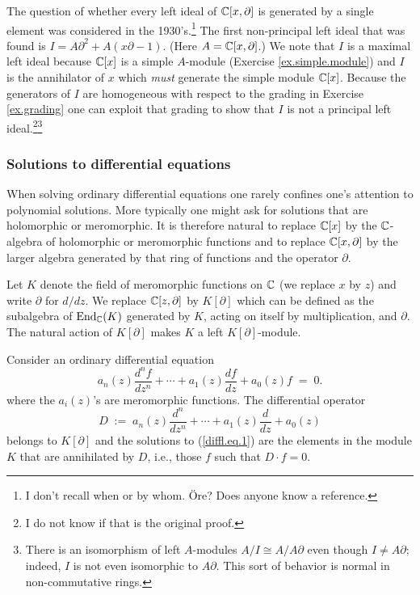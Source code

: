 \documentclass[12pt]{article}
\begin{document}
The question of whether every left ideal of $\mathbb{C}[x,\partial]$ is generated by a single element was considered in the 1930's.\footnote{I don't recall when or by whom. \"Ore? Does anyone know a reference.} The first non-principal left ideal  that was found is  
$I=A\partial^2+A(x\partial -1)$.  (Here $A=\mathbb{C}[x,\partial]$.) We note that $I$ is a maximal left ideal because $\mathbb{C}[x]$ is a simple
$A$-module (Exercise \ref{ex.simple.module}) and $I$ is the annihilator of $x$ which {\it must} generate the simple module 
$\mathbb{C}[x]$. Because the generators of $I$ are homogeneous with respect to the grading in Exercise \ref{ex.grading} one can exploit
that grading to show that $I$ is not a principal left ideal.\footnote{I do not know if that is the original proof.}\footnote{There is an 
isomorphism of left $A$-modules $A/I \cong A/A\partial$ even though $I \ne A\partial$; indeed, $I$ is not even isomorphic to
$A\partial$. This sort of behavior is normal in non-commutative rings.}




\subsubsection{Solutions to differential equations}
When solving ordinary differential equations one rarely confines one's attention to polynomial solutions.
More typically one might ask for solutions that are holomorphic or meromorphic. 
It is therefore natural to replace $\mathbb{C}[x]$ by the $\mathbb{C}$-algebra 
of holomorphic or meromorphic functions and to replace $\mathbb{C}[x,\partial]$ by the 
larger algebra generated by that ring of functions and the operator $\partial$.

Let $K$ denote the field of meromorphic functions on $\mathbb{C}$ (we replace $x$ by $z$) and write 
$\partial$ for $d/dz$. We replace $\mathbb{C}[z,\partial]$ by $K[\partial]$ which can be defined as the subalgebra of $\operatorname{End}_{\mathbb{C}}(K)$
generated by $K$, acting on itself by multiplication, and $\partial$. The natural action of $K[\partial]$ makes $K$ a left
$K[\partial]$-module.



Consider an ordinary differential equation 
\begin{equation}
\label{diffl.eq.1}
a_n(z)\frac{d^n f}{dz^n} + \cdots + a_1(z)\frac{d f}{dz} +a_0(z)f \;=\; 0.
\end{equation}
where the $a_i(z)$'s are meromorphic functions. The differential operator 
$$
D \; :=\; a_n(z)\frac{d^n }{dz^n} + \cdots + a_1(z)\frac{d }{dz} +a_0(z)
$$
belongs to $K[\partial]$ and the solutions to (\ref{diffl.eq.1})  are the elements in the module $K$ that are annihilated
by $D$, i.e., those $f$ such that $D \cdot f=0$.
\end{document}
